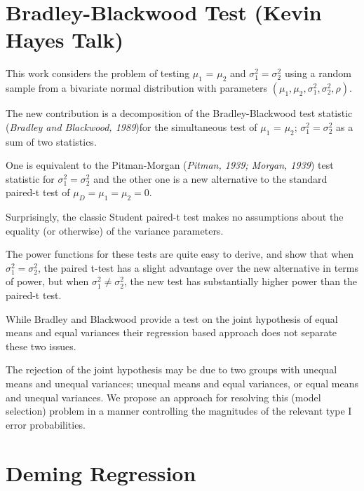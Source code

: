\documentclass[12pt, a4paper]{report}
\theoremstyle{plain}
\theoremstyle{definition}
\theoremstyle{remark}
\begin{document}
	


	\section{Bradley-Blackwood Test (Kevin Hayes Talk)}
	
	This work considers the problem of testing $\mu_1$ = $\mu_2$ and $\sigma^2_1 = \sigma^2_2$ using a random sample from a bivariate normal distribution with parameters $(\mu_1, \mu_2, \sigma^2_1, \sigma^2_2, \rho)$. 
	
	The new contribution is a decomposition of the Bradley-Blackwood test statistic (\textit{Bradley and Blackwood, 1989})for the simultaneous test of {$\mu_1$ = $\mu_2$; $\sigma^2_1 = \sigma^2_2$}  as a sum of two statistics. 
	
	One is equivalent to the Pitman-Morgan (\textit{Pitman, 1939; Morgan, 1939}) test statistic 
	for $\sigma^2_1 = \sigma^2_2$ and the other one is a new alternative to the standard paired-t test of $\mu_D = \mu_1 = \mu_2 = 0$. 
	
	Surprisingly, the classic Student paired-t test makes no assumptions about the equality (or otherwise) of the 
	variance parameters. 
	
	The power functions for these tests are quite easy to derive, and show that when $\sigma^2_1 = \sigma^2_2$, 
	the paired t-test has a slight advantage over the new alternative in terms of power, but when $\sigma^2_1 \neq \sigma^2_2$, the 
	new test has substantially higher power than the paired-t test.
	
	While Bradley and Blackwood provide a test on the joint hypothesis of equal means and equal variances their regression based approach does not separate these two issues.
	
	The rejection of the joint hypothesis may be 
	due to two groups with unequal means and unequal variances; unequal means and equal variances, or equal means and unequal variances. We propose an approach for resolving this (model selection) problem in a manner controlling the magnitudes of the relevant type I error probabilities.
	
	
	
	
	\section*{Deming Regression}
	
\end{document}
